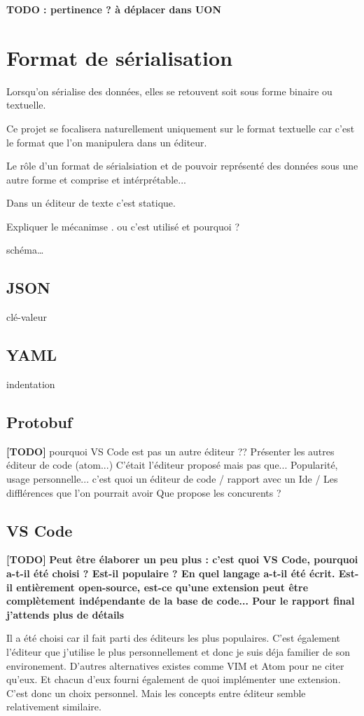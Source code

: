 \documentclass[
    iict, %
    il, %
]{heig-tb}
\begin{document}
\textbf{TODO : pertinence ? à déplacer dans UON}
\chapter{Format de sérialisation}

Lorsqu'on sérialise des données, elles se retouvent soit sous forme binaire ou textuelle.

Ce projet se focalisera naturellement uniquement sur le format textuelle car c'est le format que l'on manipulera dans un éditeur.

Le rôle d'un format de sérialsiation et de pouvoir représenté des données sous une autre forme et comprise et intérprétable...

Dans un éditeur de texte c'est statique.

Expliquer le mécanimse . ou c'est utilisé et pourquoi ?

schéma\dots


\section{JSON}
clé-valeur
\section{YAML}
indentation
\section{Protobuf}


\textbf{[TODO]}
pourquoi VS Code est pas un autre éditeur ??
Présenter les autres éditeur de code (atom...)
C'était l'éditeur proposé mais pas que...
Popularité, usage personnelle...
c'est quoi un éditeur de code / rapport avec un Ide / Les difflérences que l'on pourrait avoir
Que propose les concurents ?

\section{VS Code}
\textbf{[TODO]}
\textbf{Peut être élaborer un peu plus : c'est quoi VS Code, pourquoi a-t-il été choisi ? Est-il populaire ? En quel langage a-t-il été écrit. Est-il entièrement open-source, est-ce qu'une extension peut être complètement indépendante de la base de code...
    Pour le rapport final j'attends plus de détails}

Il a été choisi car il fait parti des éditeurs les plus populaires. C'est également l'éditeur que j'utilise le plus personnellement et donc je suis déja familier de son environement.
D'autres alternatives existes comme VIM et Atom pour ne citer qu'eux. Et chacun d'eux fourni également de quoi implémenter une extension.
C'est donc un choix personnel. Mais les concepts entre éditeur semble relativement similaire.
\end{document}
